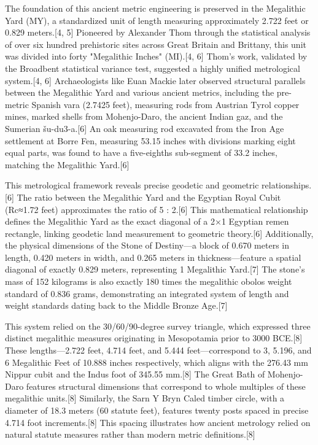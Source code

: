 \documentclass[aps,prd,11pt,onecolumn,superscriptaddress,nofootinbib,floatfix]{revtex4-2}
\begin{document}
The foundation of this ancient metric engineering is preserved in the Megalithic Yard (MY), a standardized unit of length measuring approximately 2.722 feet or 0.829 meters.[4, 5] Pioneered by Alexander Thom through the statistical analysis of over six hundred prehistoric sites across Great Britain and Brittany, this unit was divided into forty "Megalithic Inches" (MI).[4, 6] Thom's work, validated by the Broadbent statistical variance test, suggested a highly unified metrological system.[4, 6] Archaeologists like Euan Mackie later observed structural parallels between the Megalithic Yard and various ancient metrics, including the pre-metric Spanish vara (2.7425 feet), measuring rods from Austrian Tyrol copper mines, marked shells from Mohenjo-Daro, the ancient Indian gaz, and the Sumerian šu-du3-a.[6] An oak measuring rod excavated from the Iron Age settlement at Borre Fen, measuring 53.15 inches with divisions marking eight equal parts, was found to have a five-eighths sub-segment of 33.2 inches, matching the Megalithic Yard.[6]


This metrological framework reveals precise geodetic and geometric relationships.[6] The ratio between the Megalithic Yard and the Egyptian Royal Cubit (Rc≈1.72 feet) approximates the ratio of 5 : 2.[6] This mathematical relationship defines the Megalithic Yard as the exact diagonal of a 2×1 Egyptian remen rectangle, linking geodetic land measurement to geometric theory.[6] Additionally, the physical dimensions of the Stone of Destiny---a block of 0.670 meters in length, 0.420 meters in width, and 0.265 meters in thickness---feature a spatial diagonal of exactly 0.829 meters, representing 1 Megalithic Yard.[7] The stone's mass of 152 kilograms is also exactly 180 times the megalithic obolos weight standard of 0.836 grams, demonstrating an integrated system of length and weight standards dating back to the Middle Bronze Age.[7]


This system relied on the 30/60/90-degree survey triangle, which expressed three distinct megalithic measures originating in Mesopotamia prior to 3000 BCE.[8] These lengths---2.722 feet, 4.714 feet, and 5.444 feet---correspond to 3, 5.196, and 6 Megalithic Feet of 10.888 inches respectively, which aligns with the 276.43 mm Nippur cubit and the Indus foot of 345.55 mm.[8] The Great Bath of Mohenjo-Daro features structural dimensions that correspond to whole multiples of these megalithic units.[8] Similarly, the Sarn Y Bryn Caled timber circle, with a diameter of 18.3 meters (60 statute feet), features twenty posts spaced in precise 4.714 foot increments.[8] This spacing illustrates how ancient metrology relied on natural statute measures rather than modern metric definitions.[8]
\end{document}
